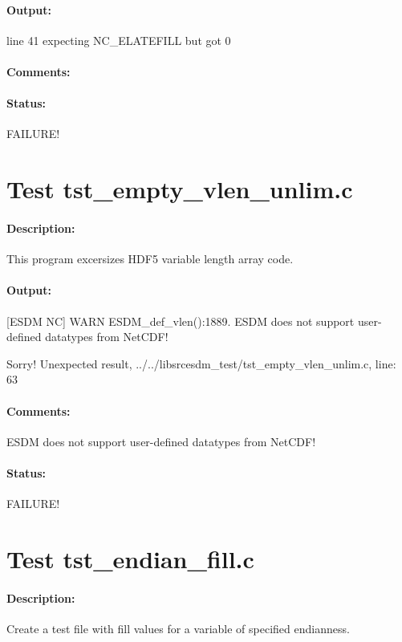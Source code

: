 \paragraph{Output:} line 41 expecting NC\_ELATEFILL but got 0

\paragraph{Comments:} {\color{blue}{Help, Julian!}}

\paragraph{Status:} FAILURE!

\section{Test tst\_empty\_vlen\_unlim.c}

\paragraph{Description:} This program excersizes HDF5 variable length array code.

\paragraph{Output:} [ESDM NC] WARN ESDM\_def\_vlen():1889. ESDM does not support user-defined datatypes from NetCDF!

Sorry! Unexpected result, ../../libsrcesdm\_test/tst\_empty\_vlen\_unlim.c, line: 63

\paragraph{Comments:} ESDM does not support user-defined datatypes from NetCDF!

\paragraph{Status:} FAILURE!

\section{Test tst\_endian\_fill.c}

\paragraph{Description:} Create a test file with fill values for a variable of specified endianness.

